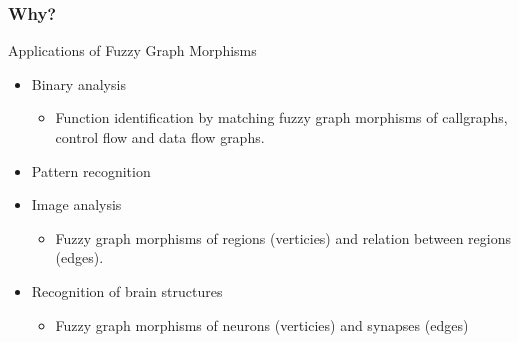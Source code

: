 


\begin{frame}
	\frametitle{Why?}

	\begin{block}{Applications of Fuzzy Graph Morphisms}
		\begin{itemize}
			\item Binary analysis
			\begin{itemize}
				\item Function identification by matching fuzzy graph morphisms of callgraphs, control flow and data flow graphs.
			\end{itemize}
			\item Pattern recognition
			\item Image analysis
			\begin{itemize}
				\item Fuzzy graph morphisms of regions (verticies) and relation between regions (edges).
			\end{itemize}
			\item Recognition of brain structures
			\begin{itemize}
				\item Fuzzy graph morphisms of neurons (verticies) and synapses (edges)
			\end{itemize}
		\end{itemize}
	\end{block}
\end{frame}
